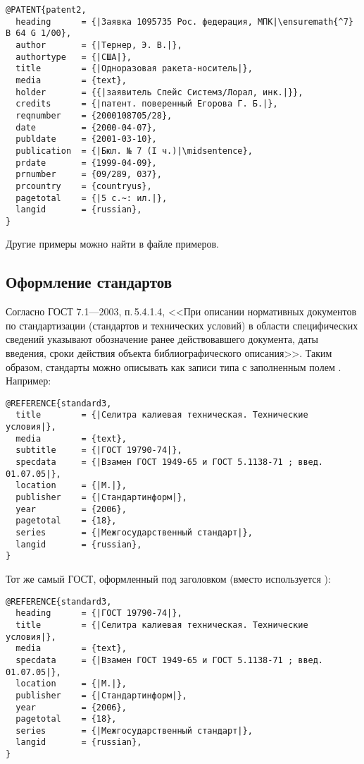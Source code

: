 \documentclass[10pt,a4paper,headings=small,numbers=enddot,english,russian]{ltxdockit}
\newcommand*{\gostbibname}[1][]{ГОСТ#1 7.1---2003\xspace}
\newcommand*{\gostbibref}[2][]{\gostbibname[#1], п.\,#2\xspace}
\begin{document}
\begin{lstlisting}[style=bibtex,escapechar=|]
@PATENT{patent2,
  heading      = {|Заявка 1095735 Рос. федерация, МПК|\ensuremath{^7} B 64 G 1/00},
  author       = {|Тернер, Э. В.|},
  authortype   = {|США|},
  title        = {|Одноразовая ракета-носитель|},
  media        = {text},
  holder       = {{|заявитель Спейс Системз/Лорал, инк.|}},
  credits      = {|патент. поверенный Егорова Г. Б.|},
  reqnumber    = {2000108705/28},
  date         = {2000-04-07},
  publdate     = {2001-03-10},
  publication  = {|Бюл. № 7 (I ч.)|\midsentence},
  prdate       = {1999-04-09},
  prnumber     = {09/289, 037},
  prcountry    = {countryus},
  pagetotal    = {|5 с.~: ил.|},
  langid       = {russian},
}
\end{lstlisting}

Другие примеры можно найти в файле примеров.

\subsection{Оформление стандартов}
\label{sec:standards}

Согласно \gostbibref{5.4.1.4},
<<При описании нормативных документов по стандартизации (стандартов и технических
условий) в области специфических сведений указывают обозначение ранее действовавшего документа,
даты введения, сроки действия объекта библиографического описания>>.
Таким образом, стандарты можно описывать как записи типа  с
заполненным полем . Например:

\begin{lstlisting}[style=bibtex,escapechar=|]
@REFERENCE{standard3,
  title        = {|Селитра калиевая техническая. Технические условия|},
  media        = {text},
  subtitle     = {|ГОСТ 19790-74|},
  specdata     = {|Взамен ГОСТ 1949-65 и ГОСТ 5.1138-71 ; введ. 01.07.05|},
  location     = {|М.|},
  publisher    = {|Стандартинформ|},
  year         = {2006},
  pagetotal    = {18},
  series       = {|Межгосударственный стандарт|},
  langid       = {russian},
}
\end{lstlisting}

Тот же самый ГОСТ, оформленный под заголовком (вместо 
используется ):

\begin{lstlisting}[style=bibtex,escapechar=|]
@REFERENCE{standard3,
  heading      = {|ГОСТ 19790-74|},
  title        = {|Селитра калиевая техническая. Технические условия|},
  media        = {text},
  specdata     = {|Взамен ГОСТ 1949-65 и ГОСТ 5.1138-71 ; введ. 01.07.05|},
  location     = {|М.|},
  publisher    = {|Стандартинформ|},
  year         = {2006},
  pagetotal    = {18},
  series       = {|Межгосударственный стандарт|},
  langid       = {russian},
}
\end{lstlisting}
\end{document}
